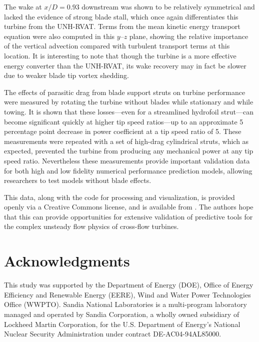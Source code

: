 \documentclass[10pt,letterpaper]{article}
\begin{document}
The wake at $x/D=0.93$ downstream was shown to be relatively symmetrical and
lacked the evidence of strong blade stall, which once again differentiates this
turbine from the UNH-RVAT. Terms from the mean kinetic energy transport equation
were also computed in this $y$--$z$ plane, showing the relative importance of
the vertical advection compared with turbulent transport terms at this location.
It is interesting to note that though the turbine is a more effective energy
converter than the UNH-RVAT, its wake recovery may in fact be slower due to
weaker blade tip vortex shedding.

The effects of parasitic drag from blade support struts on turbine performance
were measured by rotating the turbine without blades while stationary and while
towing. It is shown that these losses---even for a streamlined hydrofoil
strut---can become significant quickly at higher tip speed ratios---up to an
approximate 5 percentage point decrease in power coefficient at a tip speed
ratio of 5. These measurements were repeated with a set of high-drag cylindrical
struts, which as expected, prevented the turbine from producing any mechanical
power at any tip speed ratio. Nevertheless these measurements provide important
validation data for both high and low fidelity numerical performance prediction
models, allowing researchers to test models without blade effects.

This data, along with the code for processing and visualization, is provided
openly via a Creative Commons license, and is available from
\cite{Bachant2015-RM2-data}. The authors hope that this can provide
opportunities for extensive validation of predictive tools for the complex
unsteady flow physics of cross-flow turbines.


\section*{Acknowledgments}

This study was supported by the Department of Energy (DOE), Office of Energy
Efficiency and Renewable Energy (EERE), Wind and Water Power Technologies Office
(WWPTO). Sandia National Laboratories is a multi-program laboratory managed and
operated by Sandia Corporation, a wholly owned subsidiary of Lockheed Martin
Corporation, for the U.S. Department of Energy's National Nuclear Security
Administration under contract DE-AC04-94AL85000.

\nolinenumbers

%


\end{document}
